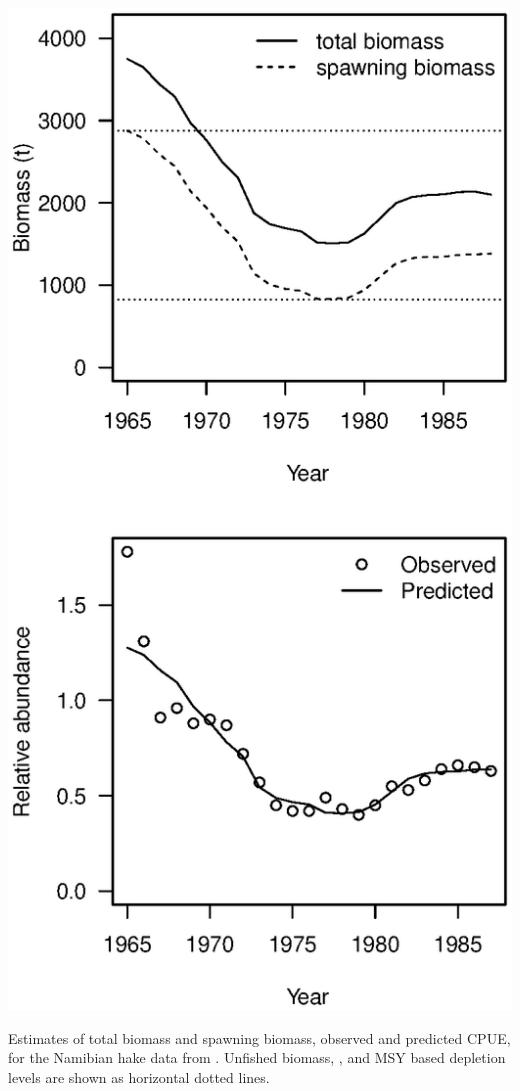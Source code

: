 \begin{multicols}{2}
\begin{figurehere}
	\centering
	\includegraphics[width=\columnwidth]{iscamFigs/NhakeFigs.eps}
	\caption{Estimates of total biomass and spawning biomass, observed and predicted CPUE, for the Namibian hake data from \iscam. Unfished biomass, \bmsy, and MSY based depletion levels are shown as horizontal dotted lines.}\label{fig4}
\end{figurehere}


\end{multicols}

